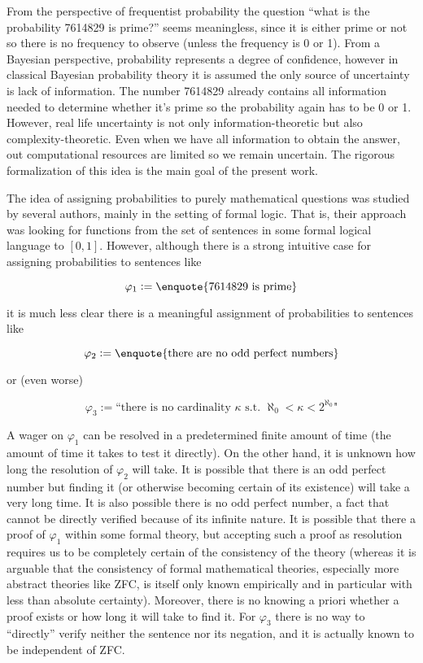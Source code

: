 \documentclass{article}
\numberwithin{equation}{section}
\theoremstyle{definition}
\theoremstyle{plain}
\begin{document}
From the perspective of frequentist probability the question \enquote{what is the probability 7614829 is prime?} seems meaningless, since it is either prime or not so there is no frequency to observe (unless the frequency is 0 or 1). From a Bayesian perspective, probability represents a degree of confidence, however in classical Bayesian probability theory it is assumed the only source of uncertainty is lack of information. The number 7614829 already contains all information needed to determine whether it's prime so the probability again has to be 0 or 1. However, real life uncertainty is not only information-theoretic but also complexity-theoretic. Even when we have all information to obtain the answer, out computational resources are limited so we remain uncertain. The rigorous formalization of this idea is the main goal of the present work.

The idea of assigning probabilities to purely mathematical questions was studied by several authors\cite{Gaifman_2004,Hutter_2013,Demski_2012,Christiano_2014,Garrabrant_2015}, mainly in the setting of formal logic. That is, their approach was looking for functions from the set of sentences in some formal logical language to $[0,1]$. However, although there is a strong intuitive case for assigning probabilities to sentences like

\[\varphi_1:=\text{\enquote{7614829 is prime}}\]

it is much less clear there is a meaningful assignment of probabilities to sentences like 

\[\varphi_2 := \text{\enquote{there are no odd perfect numbers}}\] 

or (even worse) 

\[\varphi_3 := \text{``there is no cardinality } \kappa \text{ s.t. } \aleph_0 < \kappa < 2^{\aleph_0} \text{"}\]

A wager on $\varphi_1$ can be resolved in a predetermined finite amount of time (the amount of time it takes to test it directly). On the other hand, it is unknown how long the resolution of $\varphi_2$ will take. It is possible that there is an odd perfect number but finding it (or otherwise becoming certain of its existence) will take a very long time. It is also possible there is no odd perfect number, a fact that cannot be directly verified because of its infinite nature. It is possible that there a proof of $\varphi_1$ within some formal theory, but accepting such a proof as resolution requires us to be completely certain of the consistency of the theory (whereas it is arguable that the consistency of formal mathematical theories, especially more abstract theories like ZFC, is itself only known empirically and in particular with less than absolute certainty). Moreover, there is no knowing a priori whether a proof exists or how long it will take to find it. For $\varphi_3$ there is no way to \enquote{directly} verify neither the sentence nor its negation, and it is actually known to be independent of ZFC.
\end{document}
